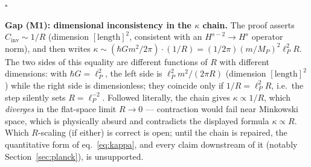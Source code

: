 \documentclass[12pt,a4paper]{article}
\begin{document}
\hfill$\square$

\smallskip\noindent\textbf{Gap (M1): dimensional inconsistency in the $\kappa$ chain.}
The proof asserts $C_{\mathrm{inv}} \sim 1/R$ (dimension $[\mathrm{length}]^2$,
consistent with an $H^{s-2}\to H^s$ operator norm), and then writes
$\kappa \sim (\hbar G m^2/2\pi)\cdot(1/R) = (1/2\pi)(m/M_P)^2\ell_P^2 R$. The two sides
of this equality are different functions of $R$ with different dimensions: with
$\hbar G = \ell_P^2$, the left side is $\ell_P^2 m^2/(2\pi R)$ (dimension
$[\mathrm{length}]^2$) while the right side is dimensionless; they coincide only if
$1/R = \ell_P^2 R$, i.e.\ the step silently sets $R = \ell_P^{-2}$. Followed literally,
the chain gives $\kappa \propto 1/R$, which \emph{diverges} in the flat-space limit
$R \to 0$ --- contraction would fail near Minkowski space, which is physically absurd
and contradicts the displayed formula $\kappa \propto R$. Which $R$-scaling (if either)
is correct is open; until the chain is repaired, the quantitative form of
eq.~\eqref{eq:kappa}, and every claim downstream of it (notably
Section~\ref{sec:planck}), is unsupported.
\end{document}
